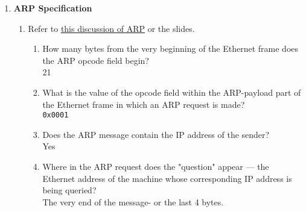 \documentclass[12pt]{article}
\begin{document}
\begin{enumerate}[label=Q\arabic*:]
      \item \textbf{ARP Specification}
            \begin{enumerate}[label=(\alph*)]
                  \item Refer to \href{http://www.erg.abdn.ac.uk/users/gorry/course/inet-pages/arp.html}{this discussion of ARP} or the slides.
                        \begin{enumerate}[label=(\roman*)]
                              \item How many bytes from the very beginning of the Ethernet frame does the ARP opcode field begin? \\
                                    21
                              \item What is the value of the opcode field within the ARP-payload part of the Ethernet frame in which an ARP request is made? \\
                                    \texttt{0x0001}
                              \item Does the ARP message contain the IP address of the sender? \\
                                    Yes
                              \item Where in the ARP request does the "question" appear — the Ethernet address of the machine whose corresponding IP address is being queried? \\
                                    The very end of the message- or the last 4 bytes.
                        \end{enumerate}
            \end{enumerate}


\end{enumerate}
\end{document}
